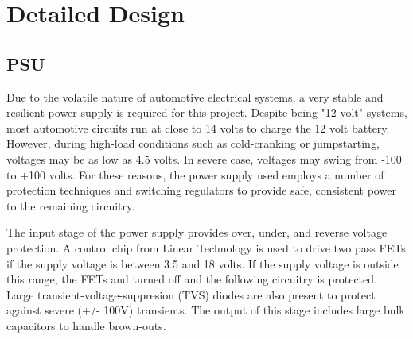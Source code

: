 \chapter{Detailed Design}




\section{PSU}
Due to the volatile nature of automotive electrical systems, a very stable and 
resilient power supply is required for this project.  Despite being "12 volt"
systems, most automotive circuits run at close to 14 volts to charge the 12
volt battery.  However, during high-load conditions such as cold-cranking or
jumpstarting, voltages may be as low as 4.5 volts.  In severe case, voltages
may swing from -100 to +100 volts.  For these reasons, the power supply used
employs a number of protection techniques and switching regulators to provide
safe, consistent power to the remaining circuitry.

The input stage of the power supply provides over, under, and reverse voltage
protection.  A control chip from Linear Technology is used to drive two pass
FETs if the supply voltage is between 3.5 and 18 volts.  If the supply voltage
is outside this range, the FETs and turned off and the following circuitry is
protected.  Large transient-voltage-suppresion (TVS) diodes are also present to
protect against severe (+/- 100V) transients.  The output of this stage includes
large bulk capacitors to handle brown-outs.

